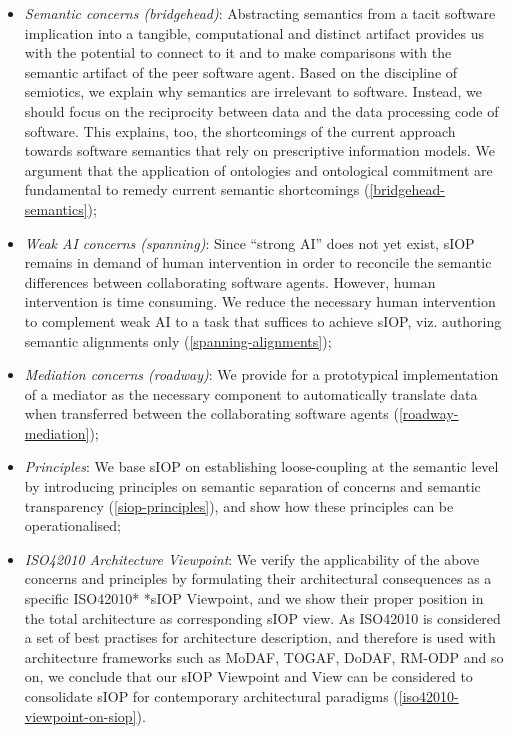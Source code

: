 \documentclass[a4paper,11pt,oneside,oldfontcommands]{memoir}
\newcounter{para}
\theoremstyle{definition}
\theoremstyle{break}		%
\numberwithin{equation}{chapter}
\numberwithin{figure}{chapter}
\begin{document}
\begin{itemize}
\tightlist
\item
  \emph{Semantic concerns (bridgehead)}: Abstracting semantics from a
  tacit software implication into a tangible, computational and distinct
  artifact provides us with the potential to connect to it and to make
  comparisons with the semantic artifact of the peer software agent.
  Based on the discipline of semiotics, we explain why semantics are
  irrelevant to software. Instead, we should focus on the reciprocity
  between data and the data processing code of software. This explains,
  too, the shortcomings of the current approach towards software
  semantics that rely on prescriptive information models. We argument
  that the application of ontologies and ontological commitment are
  fundamental to remedy current semantic shortcomings
  (\cref{bridgehead-semantics});
\item
  \emph{Weak AI concerns (spanning)}: Since ``strong AI'' does not yet
  exist, sIOP remains in demand of human intervention in order to
  reconcile the semantic differences between collaborating software
  agents. However, human intervention is time consuming. We reduce the
  necessary human intervention to complement weak AI to a task that
  suffices to achieve sIOP, viz. authoring semantic alignments only
  (\cref{spanning-alignments});
\item
  \emph{Mediation concerns (roadway)}: We provide for a prototypical
  implementation of a mediator as the necessary component to
  automatically translate data when transferred between the
  collaborating software agents (\cref{roadway-mediation});
\item
  \emph{Principles}: We base sIOP on establishing loose-coupling at the
  semantic level by introducing principles on semantic separation of
  concerns and semantic transparency (\cref{siop-principles}), and show
  how these principles can be operationalised;
\item
  \emph{ISO42010 Architecture Viewpoint}: We verify the applicability of
  the above concerns and principles by formulating their architectural
  consequences as a specific ISO42010* *sIOP Viewpoint, and we show
  their proper position in the total architecture as corresponding sIOP
  view. As ISO42010 is considered a set of best practises for
  architecture description, and therefore is used with architecture
  frameworks such as MoDAF, TOGAF, DoDAF, RM-ODP and so on, we conclude
  that our sIOP Viewpoint and View can be considered to consolidate sIOP
  for contemporary architectural paradigms
  (\cref{iso42010-viewpoint-on-siop}).
\end{itemize}
\end{document}
